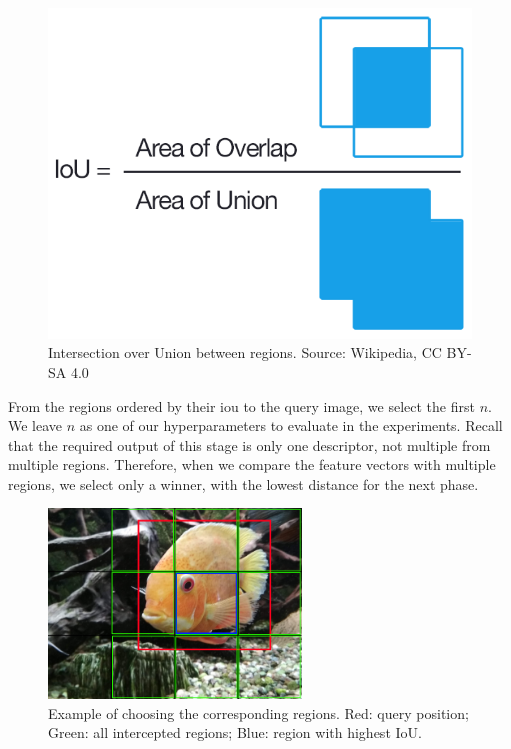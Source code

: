 \begin{figure}
    \centering
	\includegraphics[width=0.3\linewidth]{img/Intersection_over_Union_-_visual_equation.png}
	\caption{Intersection over Union between regions. Source: Wikipedia, CC BY-SA 4.0}
	\label{fig:intersection_over_union}
\end{figure}

From the regions ordered by their \acrshort{iou} to the query image, we select the first $n$. We leave $n$ as one of our hyperparameters to evaluate in the experiments. Recall that the required output of this stage is only one descriptor, not multiple from multiple regions. Therefore, when we compare the feature vectors with multiple regions, we select only a winner, with the lowest distance for the next phase. 


\begin{figure}
\centering
\includegraphics[width=0.6\textwidth]{img/fish_grid_regions}
\caption{Example of choosing the corresponding regions. Red: query position; Green: all intercepted regions; Blue: region with highest IoU.}
\label{fig:fish_with_grid}
\end{figure}



